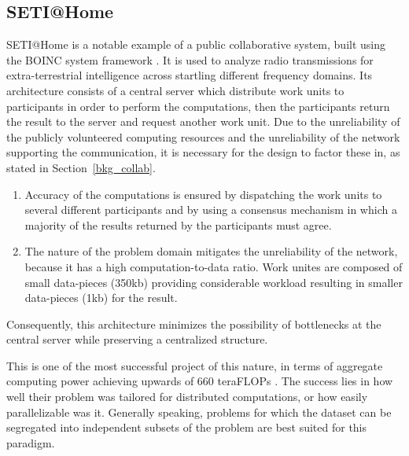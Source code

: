 \documentclass[12pt, titlepage]{uo_temp}
\begin{document}
     \subsection{SETI@Home}\label{bkg_seti}
     SETI@Home \cite{anderson2002seti} is a notable example of a public collaborative
     system, built using the BOINC system framework \cite{anderson2004boinc}.
     It is used to analyze radio transmissions for extra-terrestrial intelligence across
     startling different frequency domains.
     Its architecture consists of a central server which distribute work units to
     participants in order to perform the computations, then the participants return the
     result to the server and request another work unit.
     Due to the unreliability of the publicly volunteered computing resources and the
     unreliability of the network supporting the communication, it is necessary for the
     design to factor these in, as stated in Section~\ref{bkg_collab}. 
     \begin{enumerate}
     \item Accuracy of the computations is ensured by dispatching the work units to
     several different participants and by using a consensus mechanism in which a majority
     of the results returned by the participants must agree.
     \item The nature of the problem domain mitigates the unreliability of the network,
       because it has a high computation-to-data ratio. Work unites are composed of small
       data-pieces (350kb) providing considerable workload resulting in smaller
       data-pieces (1kb) for the result.
     \end{enumerate}
     Consequently, this architecture minimizes the possibility of bottlenecks at the central
     server while preserving a centralized structure. 
     
     This is one of the most successful project of this nature, in terms of aggregate
     computing power achieving upwards of 660 teraFLOPs \cite{wikiseti}. The success lies
     in how well their problem was tailored for distributed computations, or how easily
     parallelizable was it. Generally speaking, problems for which the dataset can be
     segregated into independent subsets of the problem are best suited for this
     paradigm.
\end{document}
